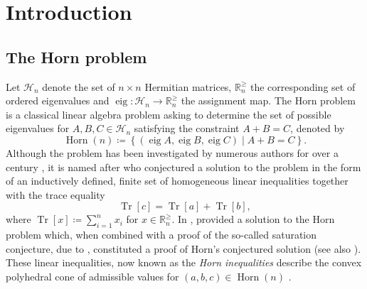 \documentclass[pdflatex, sn-mathphys-num]{sn-jnl} %
\let\oldciteauthor=\citeauthor
\def\citeauthor#1{\hypersetup{citecolor=black}\oldciteauthor{#1}\hypersetup{citecolor=blue}}
\let\oldciteyear=\citeyear
\def\citeyear#1{\hypersetup{citecolor=black}\oldciteyear{#1}\hypersetup{citecolor=blue}}
\theoremstyle{plain}
\theoremstyle{definition}
\def\hypersetup#1{}%
\DeclareMathOperator{\Tr}{Tr}
\DeclareMathOperator{\Horn}{Horn}
\DeclareMathOperator{\eig}{eig}
\newcommand{\herm}[1]{\mathcal H_{#1}}
\newcommand{\eigs}[1]{\mathbb R^{\geq}_{#1}}
\newcommand{\ea}{a}
\newcommand{\eb}{b}
\newcommand{\ec}{c}
\newcommand{\ex}{x}
\newcommand{\tex}{\Tr[\ex]}
\begin{document}
\section{Introduction}

\subsection{The Horn problem}
Let $\herm{n}$ denote the set of $n\times n$ Hermitian matrices, $\eigs{n}$ the corresponding set of ordered eigenvalues and $\eig : \herm{n} \to \eigs{n}$ the assignment map.
The Horn problem is a classical linear algebra problem asking to determine the set of possible eigenvalues for $A,B,C \in \herm{n}$ satisfying the constraint $A+B=C$, denoted by
\begin{equation}
    \Horn(n) \coloneqq \left\{ (\eig A, \eig B, \eig C) \middle| A + B = C \right\}.
\end{equation}
Although the problem has been investigated by numerous authors for over a century \cite{weyl1912asymptotische,fan1949theorem,lidskii1953proper,wielandt1955extremum,thompson1971eigenvalues,thompson1970eigenvalues}, it is named after \citeauthor{horn1962eigenvalues} who conjectured a solution to the problem in the form of an inductively defined, finite set of homogeneous linear inequalities \cite{horn1962eigenvalues} together with the trace equality
\begin{equation}
    \Tr[c] = \Tr[a] + \Tr[b],
\end{equation}
where $\tex \coloneqq \sum_{i=1}^{n} \ex_i$ for $\ex \in \eigs{n}$.
In \citeyear{klyachko1998stable}, \citeauthor{klyachko1998stable} provided a solution to the Horn problem \cite{klyachko1998stable} which, when combined with a proof of the so-called saturation conjecture, due to \citeauthor{knutson1999honeycomb} \cite{knutson1999honeycomb}, constituted a proof of Horn's conjectured solution \cite{fulton1998eigenvalues} (see also \cite{alekseev2017symplectic}).
These linear inequalities, now known as the \textit{Horn inequalities} describe the convex polyhedral cone of admissible values for $(\ea,\eb,\ec) \in \Horn(n)$ \cite{bhatia2001linear,knutson2000symplectic,fulton2000eigenvalues,niculescu2005convex}.
\end{document}
